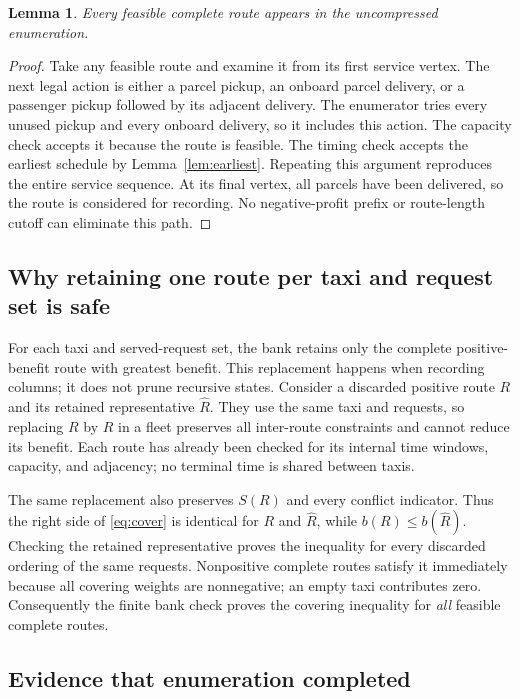 \documentclass[11pt,a4paper]{article}
\newtheorem{lemma}{Lemma}
\begin{document}
\begin{lemma}\label{lem:complete}
Every feasible complete route appears in the uncompressed enumeration.
\end{lemma}
\begin{proof}
Take any feasible route and examine it from its first service vertex. The
next legal action is either a parcel pickup, an onboard parcel delivery, or
a passenger pickup followed by its adjacent delivery. The enumerator tries
every unused pickup and every onboard delivery, so it includes this action.
The capacity check accepts it because the route is feasible. The timing
check accepts the earliest schedule by Lemma~\ref{lem:earliest}. Repeating
this argument reproduces the entire service sequence. At its final vertex,
all parcels have been delivered, so the route is considered for recording.
No negative-profit prefix or route-length cutoff can eliminate this path.
\end{proof}

\subsection{Why retaining one route per taxi and request set is safe}

For each taxi and served-request set, the bank retains only the complete
positive-benefit route with greatest benefit. This replacement happens when
recording columns; it does not prune recursive states. Consider a discarded
positive route $R$ and its retained representative $\widehat R$. They use the
same taxi and requests, so replacing $R$ by $\widehat R$ in a fleet preserves
all inter-route constraints and cannot reduce its benefit. Each route has
already been checked for its internal time windows, capacity, and adjacency;
no terminal time is shared between taxis.

The same replacement also preserves $S(R)$ and every conflict indicator.
Thus the right side of \eqref{eq:cover} is identical for $R$ and
$\widehat R$, while $b(R)\leq b(\widehat R)$. Checking the retained
representative proves the inequality for every discarded ordering of the
same requests. Nonpositive complete routes satisfy it immediately because
all covering weights are nonnegative; an empty taxi contributes zero.
Consequently the finite bank check proves the covering inequality for
\emph{all} feasible complete routes.

\subsection{Evidence that enumeration completed}
\end{document}
